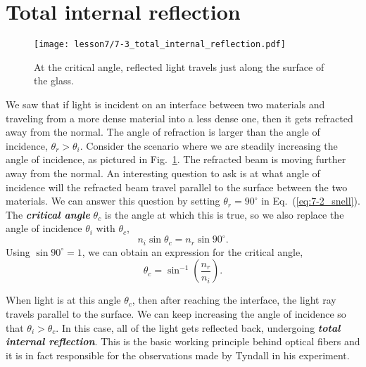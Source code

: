 \section{Total internal reflection}
\label{sec:7-3_total_internal_reflection}

\begin{figure}[t]
    \centering
    \texttt{[image: lesson7/7-3\_total\_internal\_reflection.pdf]}
    \caption[Total internal reflection.]{At the critical angle, reflected light travels just along the surface of the glass.}
    \label{fig:7-3_total_internal_reflection}
\end{figure}
We saw that if light is incident on an interface between two materials and traveling from a more dense material into a less dense one, then it gets refracted away from the normal.
The angle of refraction is larger than the angle of incidence, $\theta_r > \theta_i$.
Consider the scenario where we are steadily increasing the angle of incidence, as pictured in Fig.~\ref{fig:7-3_total_internal_reflection}.
The refracted beam is moving further away from the normal.
An interesting question to ask is at what angle of incidence will the refracted beam travel parallel to the surface between the two materials.
We can answer this question by setting $\theta_r=90^{\circ}$ in Eq.~(\ref{eq:7-2_snell}).
The \textbf{\emph{critical angle}} $\theta_c$ is the angle at which this is true, so we also replace the angle of incidence $\theta_i$ with $\theta_c$,
\begin{equation}
    n_i \sin \theta_c = n_r \sin 90^{\circ}.
    \label{eq:7-4_crit_angle}
\end{equation}
Using $\sin 90^{\circ} = 1$, we can obtain an expression for the critical angle,
\begin{equation}
    \theta_c=\sin ^{-1}\left(\frac{n_r}{n_i}\right).
    \label{eq:7-3_crit_angle}
\end{equation}

When light is at this angle $\theta_c$, then after reaching the interface, the light ray travels parallel to the surface.
We can keep increasing the angle of incidence so that $\theta_i > \theta_c$.
In this case, all of the light gets reflected back, undergoing \textbf{\emph{total internal reflection}}.
This is the basic working principle behind optical fibers and it is in fact responsible for the observations made by Tyndall in his experiment.

